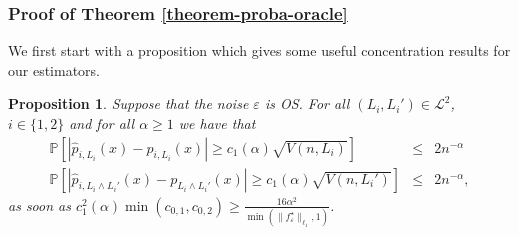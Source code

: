 \documentclass[11pt,a4paper,openany]{article}
\newtheorem{proposition}[thm]{Proposition}
\begin{document}
\subsubsection{Proof of Theorem  \ref{theorem-proba-oracle}} \label{preuve-theorem-proba-oracle}
We first start with a proposition which gives some useful concentration results for our estimators.
\begin{proposition}\label{inegalite-bernstein}
  Suppose that the noise $\varepsilon$ is OS. For all $(L_i, L_i') \in \mathcal{L}^2$, $i \in \{1, 2 \}$  and for all $ \alpha \geq 1$ we have that 
\begin{eqnarray}
\mathbb{P} [ | \widehat p_{i, L_i}(x) - p_{i, L_i}(x) | \geq c_1(\alpha) \sqrt{V(n,L_i)}] &\leq& 2 n^{-\alpha}  \label{bernstein-1} \\
\mathbb{P} [ | \widehat p_{i, L_i \wedge L_i'}(x) - p_{L_i \wedge L_i'}(x) | \geq c_1(\alpha) \sqrt{V(n,L_i')}] &\leq& 2 n^{-\alpha}  \label{bernstein-2},
\end{eqnarray}
as soon as $c_1^2(\alpha)\min({c_{0, 1}, c_{0,2}} )\geq \frac{16 \alpha^2}{\min (\| f^\star_\varepsilon \|_{\ell_1}, 1)}$.
\end{proposition}
\end{document}
